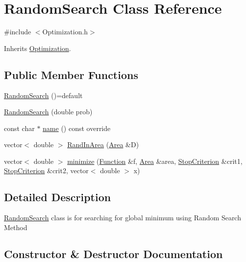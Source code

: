 \hypertarget{class_random_search}{}\section{Random\+Search Class Reference}
\label{class_random_search}


{\ttfamily \#include $<$Optimization.\+h$>$}



Inherits \hyperlink{class_optimization}{Optimization}.

\subsection*{Public Member Functions}
\begin{DoxyCompactItemize}
\item 
\hyperlink{class_random_search_a4af34d282c84acd5346f66d9cd6db882}{Random\+Search} ()=default
\item 
\hyperlink{class_random_search_a3158fb489b681187d450c5297b90ce84}{Random\+Search} (double prob)
\item 
const char $\ast$ \hyperlink{class_random_search_ae7fa0aba388b4fb39aa2aa4808575d1b}{name} () const override
\item 
vector$<$ double $>$ \hyperlink{class_random_search_a6eb6deac6e0b053f4c8ecc58bb3ca109}{Rand\+In\+Area} (\hyperlink{class_area}{Area} \&D)
\item 
vector$<$ double $>$ \hyperlink{class_random_search_a411b0ec16c09bfa51879f88bbb98692e}{minimize} (\hyperlink{class_function}{Function} \&f, \hyperlink{class_area}{Area} \&area, \hyperlink{class_stop_criterion}{Stop\+Criterion} \&crit1, \hyperlink{class_stop_criterion}{Stop\+Criterion} \&crit2, vector$<$ double $>$ x)
\end{DoxyCompactItemize}


\subsection{Detailed Description}
\hyperlink{class_random_search}{Random\+Search} class is for searching for global minimum using Random Search Method 

\subsection{Constructor \& Destructor Documentation}
\mbox{\label{class_random_search_a4af34d282c84acd5346f66d9cd6db882}} 
